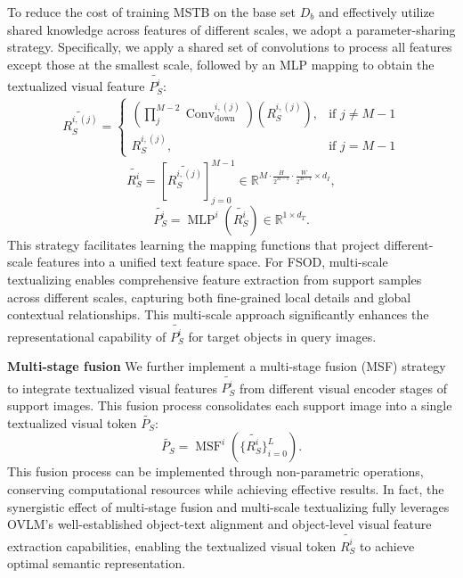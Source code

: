 \documentclass[10pt,twocolumn,letterpaper]{article}
\begin{document}
To reduce the cost of training MSTB on the base set $D_b$ and effectively utilize shared knowledge across features of different scales, we adopt a parameter-sharing strategy. Specifically, we apply a shared set of convolutions to process all features except those at the smallest scale, followed by an MLP mapping to obtain the textualized visual feature $\widetilde{P_S^i}$:
\begin{equation}
\begin{aligned}
    \widetilde{R^{i,(j)}_S} = \left\{
    \begin{array}{ll}
    \left( \prod_{j}^{M-2} \operatorname{Conv}_{\text{down}}^{i,(j)}\right) \left( R^{i,(j)}_S \right), & \text{if } j \neq M-1 \\
    R^{i,(j)}_S, & \text{if } j = M-1
    \end{array}
    \right.
\end{aligned}
\label{eq1}
\end{equation}
\begin{equation}
    \widetilde{R^i_S} = \left[ \widetilde{R^{i,(j)}_S} \right]_{j=0}^{M-1} \in \mathbb{R}^{M\cdot \frac{H}{2^{M-1}} \cdot \frac{W}{2^{M-1}} \times d_I},
    \label{eq2}
\end{equation}
\begin{equation}
    \widetilde{P^i_S} = \operatorname{MLP}^i \left( \widetilde{R^i_S} \right) \in \mathbb{R}^{1 \times d_T}.
    \label{eq3}
\end{equation}
This strategy facilitates learning the mapping functions that project different-scale features into a unified text feature space. For FSOD, multi-scale textualizing enables comprehensive feature extraction from support samples across different scales, capturing both fine-grained local details and global contextual relationships. This multi-scale approach significantly enhances the representational capability of $\widetilde{P_S^i}$ for target objects in query images.

\textbf{Multi-stage fusion} We further implement a multi-stage fusion (MSF) strategy to integrate textualized visual features $\widetilde{P_S^i}$ from different visual encoder stages of support images. This fusion process consolidates each support image into a single textualized visual token $\widetilde{P_S}$:
\begin{equation}
    \widetilde{P_S} = \operatorname{MSF}^i \left( \{ \widetilde{R^i_S}\}_{i=0}^L \right).
    \label{eq4}
\end{equation}
This fusion process can be implemented through non-parametric operations, conserving computational resources while achieving effective results. In fact, the synergistic effect of multi-stage fusion and multi-scale textualizing fully leverages OVLM's well-established object-text alignment and object-level visual feature extraction capabilities, enabling the textualized visual token $\widetilde{R^i_S}$ to achieve optimal semantic representation.
\end{document}
